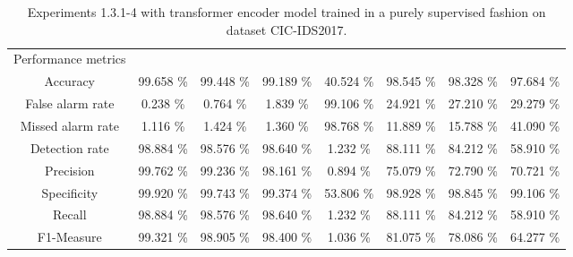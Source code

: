 \begin{table}[htb]
\begin{tabular}{@{}cccccccc@{}}
         \\
        Performance metrics &  &  &  &  &  &  &  \\
        Accuracy &  99.658 \% &  99.448 \% &  99.189 \% &  40.524 \% &  98.545 \% &  98.328 \% &  97.684 \% \\
        False alarm rate &  0.238 \% &  0.764 \% &  1.839 \% &  99.106 \% &  24.921 \% &  27.210 \% &  29.279 \% \\
        Missed alarm rate &  1.116 \% &  1.424 \% &  1.360 \% &  98.768 \% &  11.889 \% &  15.788 \% &  41.090 \% \\
        Detection rate &  98.884 \% &  98.576 \% &  98.640 \% &  1.232 \% &  88.111 \% &  84.212 \% &  58.910 \% \\
        Precision &  99.762 \% &  99.236 \% &  98.161 \% &  0.894 \% &  75.079 \% &  72.790 \% &  70.721 \% \\
        Specificity &  99.920 \% &  99.743 \% &  99.374 \% &  53.806 \% &  98.928 \% &  98.845 \% &  99.106 \% \\
        Recall &  98.884 \% &  98.576 \% &  98.640 \% &  1.232 \% &  88.111 \% &  84.212 \% &  58.910 \% \\
        F1-Measure &  99.321 \% &  98.905 \% &  98.400 \% &  1.036 \% &  81.075 \% &  78.086 \% &  64.277 \% \\
        \bottomrule
    \end{tabular}
    \caption{Experiments 1.3.1-4 with transformer encoder model trained in a purely supervised fashion on dataset CIC-IDS2017.}
    \label{table:results:lstm:stats_flows_supervised}
\end{table}
